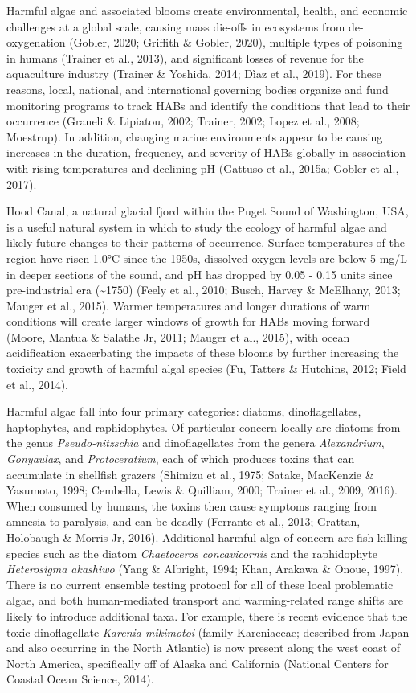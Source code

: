\documentclass[
]{article}
\begin{document}
Harmful algae and associated blooms create environmental, health, and
economic challenges at a global scale, causing mass die-offs in
ecosystems from de-oxygenation (Gobler, 2020; Griffith \& Gobler, 2020),
multiple types of poisoning in humans (Trainer et al., 2013), and
significant losses of revenue for the aquaculture industry (Trainer \&
Yoshida, 2014; Dìaz et al., 2019). For these reasons, local, national,
and international governing bodies organize and fund monitoring programs
to track HABs and identify the conditions that lead to their occurrence
(Graneli \& Lipiatou, 2002; Trainer, 2002; Lopez et al., 2008;
Moestrup). In addition, changing marine environments appear to be
causing increases in the duration, frequency, and severity of HABs
globally in association with rising temperatures and declining pH
(Gattuso et al., 2015a; Gobler et al., 2017).

Hood Canal, a natural glacial fjord within the Puget Sound of
Washington, USA, is a useful natural system in which to study the
ecology of harmful algae and likely future changes to their patterns of
occurrence. Surface temperatures of the region have risen 1.0°C since
the 1950s, dissolved oxygen levels are below 5 mg/L in deeper sections
of the sound, and pH has dropped by 0.05 - 0.15 units since
pre-industrial era (\textasciitilde1750) (Feely et al., 2010; Busch,
Harvey \& McElhany, 2013; Mauger et al., 2015). Warmer temperatures and
longer durations of warm conditions will create larger windows of growth
for HABs moving forward (Moore, Mantua \& Salathe Jr, 2011; Mauger et
al., 2015), with ocean acidification exacerbating the impacts of these
blooms by further increasing the toxicity and growth of harmful algal
species (Fu, Tatters \& Hutchins, 2012; Field et al., 2014).

Harmful algae fall into four primary categories: diatoms,
dinoflagellates, haptophytes, and raphidophytes. Of particular concern
locally are diatoms from the genus \emph{Pseudo-nitzschia} and
dinoflagellates from the genera \emph{Alexandrium}, \emph{Gonyaulax},
and \emph{Protoceratium}, each of which produces toxins that can
accumulate in shellfish grazers (Shimizu et al., 1975; Satake, MacKenzie
\& Yasumoto, 1998; Cembella, Lewis \& Quilliam, 2000; Trainer et al.,
2009, 2016). When consumed by humans, the toxins then cause symptoms
ranging from amnesia to paralysis, and can be deadly (Ferrante et al.,
2013; Grattan, Holobaugh \& Morris Jr, 2016). Additional harmful alga of
concern are fish-killing species such as the diatom \emph{Chaetoceros
concavicornis} and the raphidophyte \emph{Heterosigma akashiwo} (Yang \&
Albright, 1994; Khan, Arakawa \& Onoue, 1997). There is no current
ensemble testing protocol for all of these local problematic algae, and
both human-mediated transport and warming-related range shifts are
likely to introduce additional taxa. For example, there is recent
evidence that the toxic dinoflagellate \emph{Karenia mikimotoi} (family
Kareniaceae; described from Japan and also occurring in the North
Atlantic) is now present along the west coast of North America,
specifically off of Alaska and California (National Centers for Coastal
Ocean Science, 2014).
\end{document}
